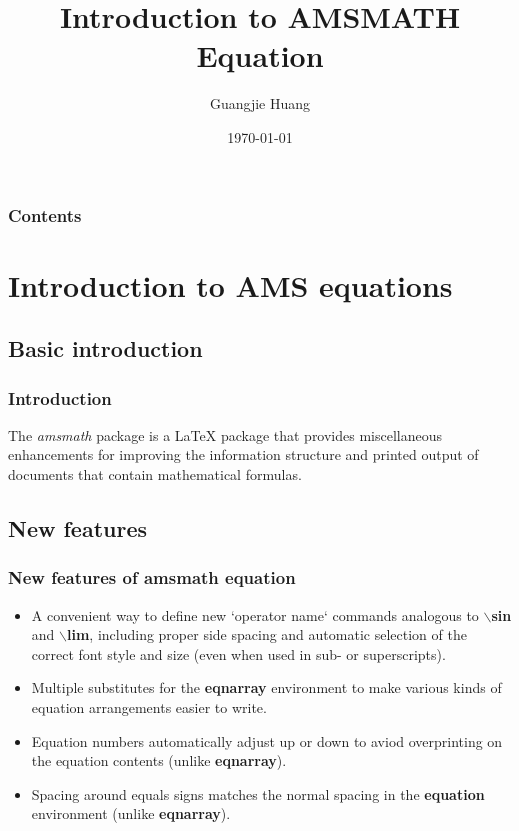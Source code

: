 \documentclass[12pt]{beamer}
\title{Introduction to AMSMATH Equation}
\author{Guangjie Huang}
\institute{Electrical and Computer Engineering \\ Auburn University}
\date{\scriptsize{\today}}
\begin{document}
\maketitle


\begin{frame}
\frametitle{Contents}
\tableofcontents
\end{frame}

  \section{Introduction to AMS equations}
  \subsection{Basic introduction}
  \begin{frame}
    \frametitle{Introduction}
    The \emph{amsmath} package is a \LaTeX{} package that provides miscellaneous enhancements for improving the information structure and printed output of documents that contain mathematical formulas.
  \end{frame}
  \subsection{New features}
  \begin{frame}
    \frametitle{New features of amsmath equation}
    \begin{itemize}
      \item A convenient way to define new `operator name` commands analogous to $\backslash$\textbf{sin} and $\backslash$\textbf{lim}, including proper side spacing and automatic selection of the correct font style and size (even when used in sub- or superscripts).
      \item Multiple substitutes for the \textbf{eqnarray} environment to make various kinds of equation arrangements easier to write.
      \item Equation numbers automatically adjust up or down to aviod overprinting on the equation contents (unlike \textbf{eqnarray}).
      \item Spacing around equals signs matches the normal spacing in the \textbf{equation} environment (unlike \textbf{eqnarray}).
    \end{itemize}
  \end{frame}
\end{document}

